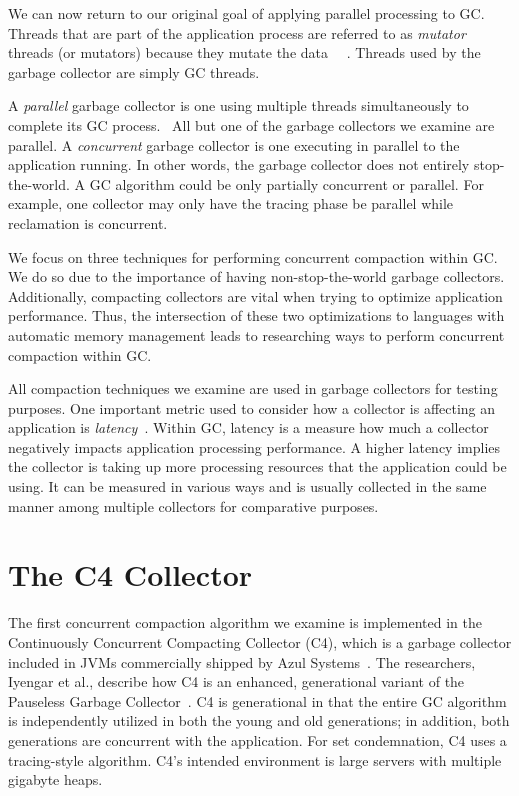 \documentclass{sig-alternate}
\begin{document}
We can now return to our original goal of applying parallel processing to GC.
Threads that are part of the application process are referred to as \emph{mutator}
threads (or mutators) because they mutate the data~\cite{Tene:C4}~\cite{Iyengar:Collie}
\cite{Osterlund:FPP}. Threads used by the garbage collector are simply GC threads.

A \emph{parallel} garbage collector is one using
multiple threads simultaneously to complete its GC process.~\cite{Puffitsch:background}
All but one of the garbage collectors we examine are parallel. A \emph{concurrent} garbage
collector is one executing in parallel to the application running. In other 
words, the garbage collector does not entirely stop-the-world. A GC algorithm
could be only partially concurrent or parallel. For example, one collector may
only have the tracing phase be parallel while reclamation is concurrent.

We focus on three techniques for performing
concurrent compaction within GC. We do so due to the importance 
of having non-stop-the-world garbage collectors. Additionally, compacting
collectors are vital when trying to optimize application performance. Thus,
the intersection of these two optimizations to languages with automatic memory management leads
to researching ways to perform concurrent compaction within GC.

All compaction techniques we examine are used in garbage
collectors for testing purposes. One important metric used to consider
how a collector is affecting an application is \emph{latency}~\cite{Lindblom:2011}.
Within GC, latency is a measure how much a collector negatively impacts
application processing performance. A higher latency implies the collector
is taking up more processing resources that the application could be using. It 
can be measured in various ways and is usually collected in the same manner
among multiple collectors for comparative purposes.


\section{The C4 Collector}
\label{sec:c4}

The first concurrent compaction algorithm we examine is implemented in the 
Continuously Concurrent Compacting Collector (C4), which is a garbage collector 
included in JVMs commercially shipped by Azul Systems~\cite{Tene:C4}. The 
researchers, Iyengar et al., describe how C4 is an enhanced, generational variant
of the Pauseless Garbage Collector~\cite{Click:Pauseless}. C4 is generational in 
that the entire GC algorithm is independently utilized in both the young and old generations;
in addition, both generations are concurrent with the application. 
For set condemnation, C4 uses a tracing-style algorithm.
C4's intended environment is large servers with multiple gigabyte heaps.
\end{document}
